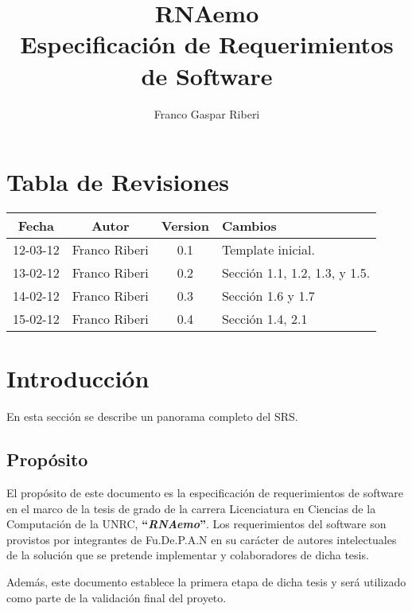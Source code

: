 \documentclass[12pt,a4paper,english,spanish]{article}
\title{\textbf{RNAemo}\\ \vspace{0.45cm} Especificación de Requerimientos de Software} %
\author{Franco Gaspar Riberi}
\newcommand{\rnaemo}{\textbf{\emph{RNAemo}}}
\begin{document}
\maketitle\pagebreak{}\tableofcontents{}\pagebreak{}

\section*{Tabla de Revisiones}
	
\begin{center}
\begin{tabular}{| c | c | c | l |}
	\hline
	{\bf Fecha} & {\bf Autor} & {\bf Version} & {\bf Cambios}\\
	\hline
	\hline		
	12-03-12 & Franco Riberi & 0.1 & Template inicial.\\\hline
	13-02-12 & Franco Riberi & 0.2 & Sección 1.1, 1.2, 1.3,  y 1.5.\\\hline
	14-02-12 & Franco Riberi & 0.3 & Sección 1.6 y 1.7\\\hline
	15-02-12 & Franco Riberi & 0.4 & Sección 1.4, 2.1 \\\hline
\end{tabular}
\end{center}
\newpage

\section{Introducción}
En esta sección se describe un panorama completo del SRS.

\subsection{Propósito}
\par El propósito de este documento es la especificación de requerimientos
de software en el marco de la tesis de grado de la carrera Licenciatura en
Ciencias de la Computación de la UNRC, \textbf{``}\rnaemo\textbf{''}.  Los requerimientos 
del software son provistos por integrantes de Fu.De.P.A.N en su carácter de autores
intelectuales de la solución que se pretende implementar y colaboradores
de dicha tesis.
\par Además, este documento establece la primera etapa de dicha tesis y será utilizado
como parte de la validación final del proyeto.
\end{document}
